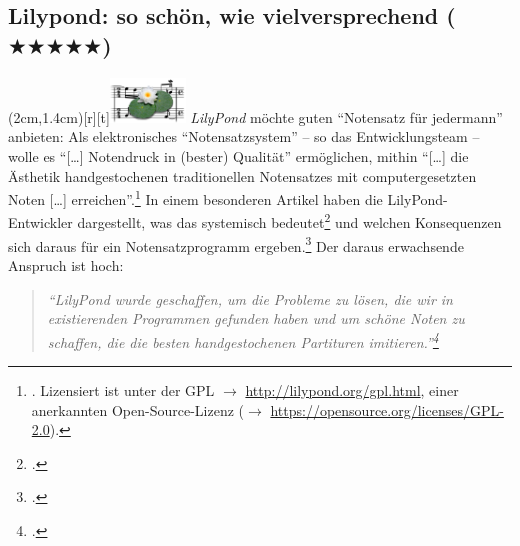 %
%
%



\subsection{Lilypond: so schön, wie vielversprechend ($\bigstar\bigstar\bigstar\bigstar\bigstar$)}

\parpic(2cm,1.4cm)[r][t]{\includegraphics[width=2cm]{logos/lilypond-300dpi.png}}
\textit{LilyPond} möchte guten \enquote{Notensatz für jedermann} anbieten: Als
elektronisches \enquote{Notensatzsystem} -- so das Entwicklungsteam -- wolle es
\enquote{[\ldots] Notendruck in (bester) Qualität} ermöglichen, mithin
\enquote{[\ldots] die Ästhetik handgestochenen traditionellen Notensatzes mit
computergesetzten Noten [\ldots] erreichen}.\footnote{\cite[vgl.][\nopage
wp]{LilyPond2018a}. Lizensiert ist  unter der GPL $\rightarrow$
\href{http://lilypond.org/gpl.html}{http://lilypond.org/gpl.html}, einer
anerkannten Open-Source-Lizenz ($\rightarrow$
\href{https://opensource.org/licenses/GPL-2.0}
{https://opensource.org/licenses/GPL-2.0}). } In einem besonderen Artikel haben
die LilyPond-Entwickler dargestellt, was das systemisch
bedeutet\footcite[vgl.][5ff]{LilyPond2018d} und welchen Konsequenzen sich daraus
für ein Notensatzprogramm ergeben.\footcite[vgl.][8ff]{LilyPond2018d} Der daraus
erwachsende Anspruch ist hoch:

\begin{quote}\textit{\enquote{LilyPond wurde geschaffen, um die Probleme zu
lösen, die wir in existierenden Programmen gefunden haben und um schöne Noten zu
schaffen, die die besten handgestochenen Partituren
imitieren.}\footcite[vgl.][2]{LilyPond2018d} }
\end{quote}

